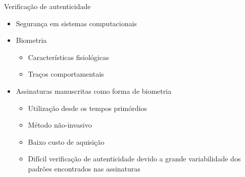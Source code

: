 
\begin{frame}{Verificação de autenticidade}
	\baselineskip
	\begin{itemize}
		\item Segurança em sistemas computacionais
		\bigskip
		\item Biometria
		\begin{itemize}
			\item Características fisiológicas
			\item Traços comportamentais
		\end{itemize}
		\bigskip
		\item Assinaturas manuscritas como forma de biometria
		\begin{itemize}
			\item Utilização desde os tempos primórdios
			\item Método não-invasivo
			\item Baixo custo de aquisição
			\item Difícil verificação de autenticidade devido a grande variabilidade dos padrões encontrados nas assinaturas
		\end{itemize}
	\end{itemize}
\end{frame}
